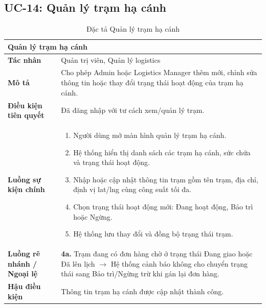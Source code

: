 \subsection{UC-14: Quản lý trạm hạ cánh}
\begin{table}[H]
  \centering
  \begin{tabularx}{\textwidth}{|l|X|}
    \hline
    \multicolumn{2}{|l|}{\textbf{Quản lý trạm hạ cánh}} \\
    \hline
    \textbf{Tác nhân}           & Quản trị viên, Quản lý logistics \\ \hline
    \textbf{Mô tả}              & Cho phép Admin hoặc Logistics Manager thêm mới, chỉnh sửa thông tin hoặc thay đổi trạng thái hoạt động của trạm hạ cánh. \\ \hline
    \textbf{Điều kiện tiên quyết} & Đã đăng nhập với tư cách xem/quản lý trạm. \\ \hline
    \textbf{Luồng sự kiện chính} &
      \begin{enumerate}[leftmargin=*, nosep, topsep=0pt]
        \item Người dùng mở màn hình quản lý trạm hạ cánh.
        \item Hệ thống hiển thị danh sách các trạm hạ cánh, sức chứa và trạng thái hoạt động.
        \item Nhập hoặc cập nhật thông tin trạm gồm tên trạm, địa chỉ, định vị lat/lng cùng công suất tối đa.
        \item Chọn trạng thái hoạt động mới: Đang hoạt động, Bảo trì hoặc Ngừng.
        \item Hệ thống lưu thay đổi và đồng bộ trạng thái trạm.
      \end{enumerate} \\ \hline
    \textbf{Luồng rẽ nhánh / Ngoại lệ} &
      \textbf{4a.} Trạm đang có đơn hàng chờ ở trạng thái Đang giao hoặc Đã lên lịch $\rightarrow$ Hệ thống cảnh báo không cho chuyển trạng thái sang Bảo trì/Ngừng trừ khi gán lại đơn hàng. \\ \hline
    \textbf{Hậu điều kiện}      & Thông tin trạm hạ cánh được cập nhật thành công. \\
    \hline
  \end{tabularx}
  \caption{Đặc tả Quản lý trạm hạ cánh}
  \label{tab:uc14}
\end{table}

